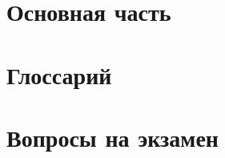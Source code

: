 \documentclass[
    14pt,
    a4paper,
    oneside,
    openany,
    draft
]{extreport}
\begin{document}

\chapter{Основная часть}






%

%

%

%

%

%

%


\chapter{Глоссарий}

\chapter{Вопросы на экзамен}



%
\printbibliography[heading=bibintoc]

\end{document}
